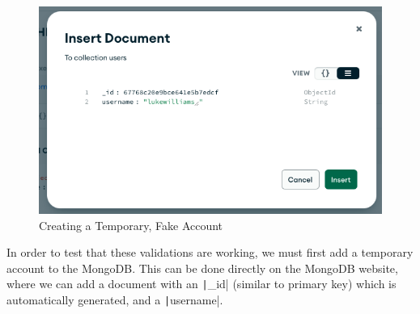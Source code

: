 \documentclass[12pt]{report}
\newcommand{\pil}[1]{\protect\texttt|#1|}
\begin{document}
\begin{figure}[H]
\centering
\includegraphics[width=12cm]{ss15.6.png}
\caption{Creating a Temporary, Fake Account}\label{fig:ss15.6}
\end{figure}

In order to test that these validations are working, we must first add a temporary account to the MongoDB. This can be done directly on the MongoDB website, where we can add a document with an \pil{_id} (similar to primary key) which is automatically generated, and a \pil{username}.
\end{document}

